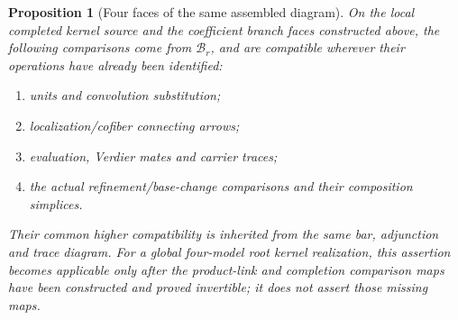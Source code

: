 \documentclass[11pt]{article}
\newtheorem{proposition}{Proposition}[section]
\theoremstyle{definition}
\theoremstyle{remark}
\begin{document}
\begin{proposition}[Four faces of the same assembled diagram]
\label{prop:root-four-faces}
On the local completed kernel source and the coefficient branch
faces constructed above, the following comparisons come from
$\mathcal B_r$, and are compatible wherever their operations have
already been identified:
\begin{enumerate}
\item units and convolution substitution;
\item localization/cofiber connecting arrows;
\item evaluation, Verdier mates and carrier traces;
\item the actual refinement/base-change comparisons and their
composition simplices.
\end{enumerate}
Their common higher compatibility is inherited from the same bar,
adjunction and trace diagram.  For a global four-model root kernel
realization, this assertion becomes applicable only after the
product-link and completion comparison maps have been constructed
and proved invertible; it does not assert those missing maps.
\end{proposition}
\end{document}
